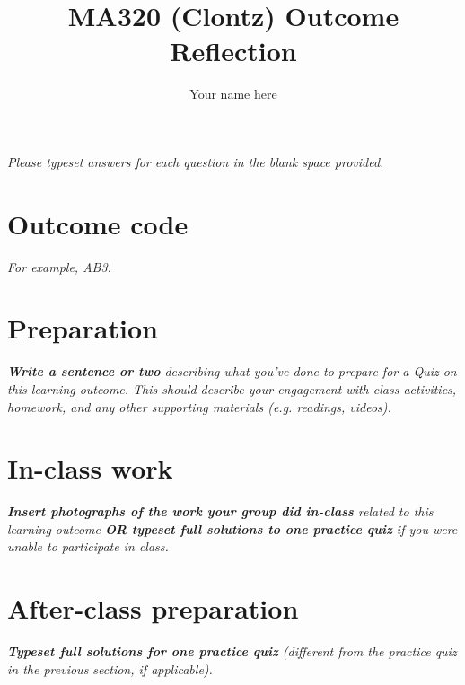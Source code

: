 \documentclass{article}
\title{MA320 (Clontz) Outcome Reflection}
\author{Your name here}
\begin{document}
\maketitle

\textit{Please typeset answers for each question in the blank space provided.}

\section{Outcome code}
\textit{For example, AB3.}








\section{Preparation}
\textit{\textbf{Write a sentence or two} describing what you’ve done to prepare for a Quiz on this learning outcome. This should describe your engagement with class activities, homework, and any other supporting materials (e.g. readings, videos).}








\section{In-class work}
\textit{\textbf{Insert photographs of the work your group did in-class} related to this learning outcome \textbf{OR typeset full solutions to one practice quiz} if you were unable to participate in class.}





\section{After-class preparation}
\textit{\textbf{Typeset full solutions for one practice quiz} (different from the practice quiz in the previous section, if applicable).}

\end{document}
